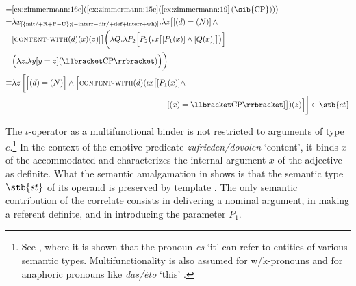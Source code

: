 \documentclass[output=paper]{langscibook}
\begin{document}
\ea\label{ex:zimmermann:20} 
 \medskip\\\noindent
\begin{equation*}\begin{split}
 = & \text{\ref{ex:zimmermann:16c}(\ref{ex:zimmermann:15c}(\ref{ex:zimmermann:19}\,(\sib{CP})))}\\
 = & \lambda x\textsubscript{[\{mit/$+$R$+$P$-$U\};($-$interr$-$dir/$+$def$+$interr$+$wh)]} . \lambda z \big[[(d) = (N)] \, \wedge\\
   & [\textsc{content-with} (d) (x) (z)]\big] \bigg(\lambda Q . \lambda P_2 \Big[P_2 \big(\iota x \big[[P_1(x)] \wedge [Q (x)]\big]\big)\Big]\\
   & \Big(\lambda z . \lambda y [y = z] (\llbracket \text{CP}\rrbracket)\Big)\bigg) \\
\equiv & \lambda z \, \bigg[\Big[(d) = (N)\Big] \wedge \Big[\textsc{content-with} (d) (\iota x \big[[P_1 (x)] \wedge \\
       & \hspace{7cm} [(x) = \llbracket\text{CP}\rrbracket]\big]) (z)\Big]\bigg] \in \stb{et}
\end{split}\end{equation*}
\z

\noindent The $\iota$-operator as a multifunctional binder is not restricted to arguments of type $e$.\footnote{See \citet{Zimmermann2016a}, where it is shown that the pronoun \textit{es} `it' can refer to entities of various semantic types. Multifunctionality is also assumed for w/k-pronouns and for anaphoric pronouns like \textit{das/ėto} `this' \citep{Zimmermann2019c}.} In the context of the emotive predicate \textit{zufrieden/dovolen} `content', it binds $x$ of the accommodated  and characterizes the internal argument $x$ of the adjective as definite. What the semantic amalgamation in  shows is that the semantic type $\stb{st}$ of its operand  is preserved by template . The only semantic contribution of the correlate consists in delivering a nominal argument, in making a referent definite, and in introducing the parameter $P_1$.
\end{document}
